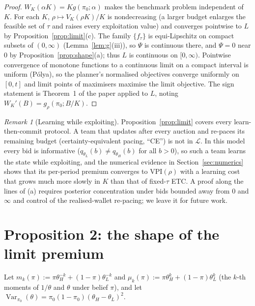 \documentclass[11pt]{article}
\theoremstyle{definition}
\theoremstyle{remark}
\newtheorem{remark}{Remark}
\newcommand{\VPI}{\mathrm{VPI}}
\newcommand{\cL}{\mathcal{L}}
\DeclareMathOperator{\Var}{Var}
\begin{document}
\begin{proof}
$W_K(\alpha K)=Kg(\pi_0;\alpha)$ makes the benchmark problem independent of $K$. For each $K$,
$\rho\mapsto V_K(\rho K)/K$ is nondecreasing (a larger budget enlarges the feasible set of $\tau$ and raises every
exploitation value) and converges pointwise to $L$ by Proposition~\ref{prop:limit}(c). The family
$\{f_\tau\}$ is equi-Lipschitz on compact subsets of $(0,\infty)$ (Lemma~\ref{lem:g}(iii)), so $\Psi$ is continuous
there, and $\Psi=0$ near $0$ by Proposition~\ref{prop:shape}(a); thus $L$ is continuous on $[0,\infty)$. Pointwise
convergence of monotone functions to a continuous limit on a compact interval is uniform (P\'olya), so the planner's
normalised objectives converge uniformly on $[0,t]$ and limit points of maximisers maximise the limit objective. The
sign statement is Theorem~1 of the paper applied to $L$, noting $W_K'(B)=g_\rho(\pi_0;B/K)$.
\end{proof}

\begin{remark}[Learning while exploiting]
Proposition~\ref{prop:limit} covers every learn-then-commit protocol. A team that updates after every auction and
re-paces its remaining budget (certainty-equivalent pacing, ``CE'') is not in $\cL$. In this model every bid is
informative ($q_{\theta_L}(b)\neq q_{\theta_H}(b)$ for all $b>0$), so such a team learns the state while exploiting,
and the numerical evidence in Section~\ref{sec:numerics} shows that its per-period premium converges to $\VPI(\rho)$ with a learning cost
that grows much more slowly in $K$ than that of fixed-$\tau$ ETC. A proof along the lines of (a) requires posterior concentration under
bids bounded away from $0$ and $\infty$ and control of the realised-wallet re-pacing; we leave it for future work.
\end{remark}

\section{Proposition 2: the shape of the limit premium}\label{sec:prop2}

Let $m_k(\pi):=\pi\theta_H^{-k}+(1-\pi)\theta_L^{-k}$ and $\mu_k(\pi):=\pi\theta_H^{k}+(1-\pi)\theta_L^{k}$ (the $k$-th
moments of $1/\theta$ and $\theta$ under belief $\pi$), and let $\Var_{\pi_0}(\theta)=\pi_0(1-\pi_0)(\theta_H-\theta_L)^2$.
\end{document}
